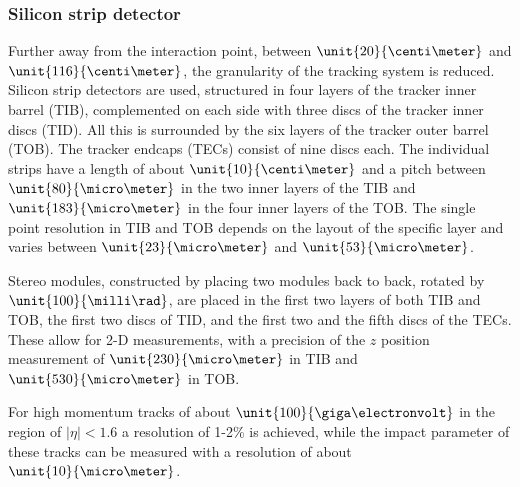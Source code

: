 \subsubsection*{Silicon strip detector}
Further away from the interaction point, between $\unit{20}{\centi\meter}$ and $\unit{116}{\centi\meter}$, the granularity of the tracking system is reduced. Silicon strip detectors are used, structured in four layers of the tracker inner barrel (TIB), complemented on each side with three discs of the tracker inner discs (TID). All this is surrounded by the six layers of the tracker outer barrel (TOB). The tracker endcaps (TECs) consist of nine discs each. The individual strips have a length of about $\unit{10}{\centi\meter}$ and a pitch between $\unit{80}{\micro\meter}$ in the two inner layers of the TIB and $\unit{183}{\micro\meter}$ in the four inner layers of the TOB. The single point resolution in TIB and TOB depends on the layout of the specific layer and varies between $\unit{23}{\micro\meter}$ and $\unit{53}{\micro\meter}$. 

Stereo modules, constructed by placing two modules back to back, rotated by $\unit{100}{\milli\rad}$, are placed in the first two layers of both TIB and TOB, the first two discs of TID, and the first two and the fifth discs of the TECs. These allow for 2-D measurements, with a precision of the $z$ position measurement of $\unit{230}{\micro\meter}$ in TIB and $\unit{530}{\micro\meter}$ in TOB. 

For high momentum tracks of about $\unit{100}{\giga\electronvolt}$ in the region of $\vert \eta \vert < 1.6$ a \pt resolution of 1-2\% is achieved, while the impact parameter of these tracks can be measured with a resolution of about $\unit{10}{\micro\meter}$. 

